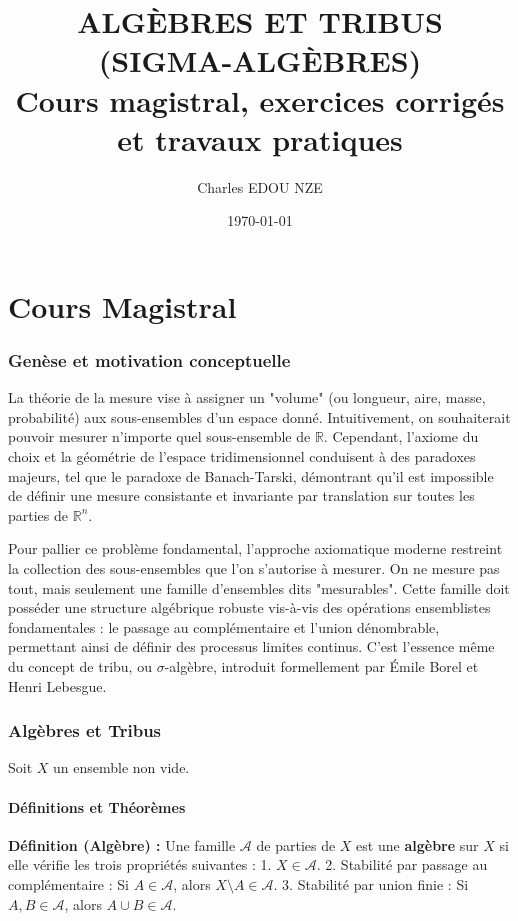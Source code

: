 \documentclass[11pt,a4paper]{article}
\title{\Huge ALGÈBRES ET TRIBUS (SIGMA-ALGÈBRES) \\ \large Cours magistral, exercices corrigés et travaux pratiques}
\author{\Large Charles EDOU NZE}
\date{\today}
\begin{document}
\maketitle
\tableofcontents
\newpage

\part{Cours Magistral}

\section{Genèse et motivation conceptuelle}

La théorie de la mesure vise à assigner un "volume" (ou longueur, aire, masse, probabilité) aux sous-ensembles d'un espace donné. Intuitivement, on souhaiterait pouvoir mesurer n'importe quel sous-ensemble de $\mathbb{R}$. Cependant, l'axiome du choix et la géométrie de l'espace tridimensionnel conduisent à des paradoxes majeurs, tel que le paradoxe de Banach-Tarski, démontrant qu'il est impossible de définir une mesure consistante et invariante par translation sur toutes les parties de $\mathbb{R}^n$.

Pour pallier ce problème fondamental, l'approche axiomatique moderne restreint la collection des sous-ensembles que l'on s'autorise à mesurer. On ne mesure pas tout, mais seulement une famille d'ensembles dits "mesurables". Cette famille doit posséder une structure algébrique robuste vis-à-vis des opérations ensemblistes fondamentales : le passage au complémentaire et l'union dénombrable, permettant ainsi de définir des processus limites continus. C'est l'essence même du concept de tribu, ou $\sigma$-algèbre, introduit formellement par Émile Borel et Henri Lebesgue.

\section{Algèbres et Tribus}

Soit $X$ un ensemble non vide.

\subsection{Définitions et Théorèmes}

\textbf{Définition (Algèbre) :}
Une famille $\mathcal{A}$ de parties de $X$ est une \textbf{algèbre} sur $X$ si elle vérifie les trois propriétés suivantes :
1. $X \in \mathcal{A}$.
2. Stabilité par passage au complémentaire : Si $A \in \mathcal{A}$, alors $X \setminus A \in \mathcal{A}$.
3. Stabilité par union finie : Si $A, B \in \mathcal{A}$, alors $A \cup B \in \mathcal{A}$.
\end{document}
